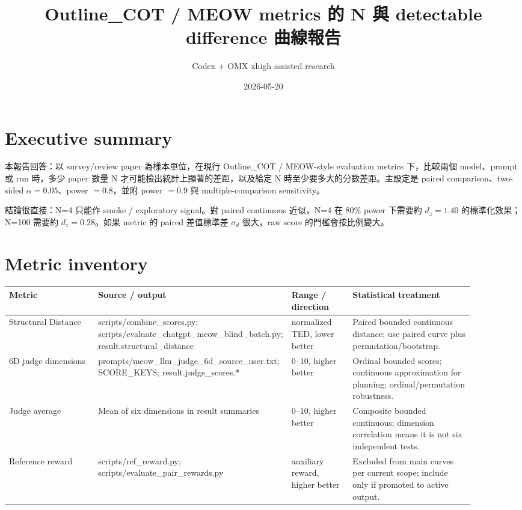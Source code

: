 \documentclass[11pt]{article}
\title{Outline\_COT / MEOW metrics 的 N 與 detectable difference 曲線報告}
\author{Codex + OMX xhigh assisted research}
\date{2026-05-20}
\begin{document}
\maketitle

\section*{Executive summary}
本報告回答：以 survey/review paper 為樣本單位，在現行 Outline\_COT / MEOW-style evaluation metrics 下，比較兩個 model、prompt 或 run 時，多少 paper 數量 N 才可能檢出統計上顯著的差距，以及給定 N 時至少要多大的分數差距。主設定是 paired comparison、two-sided $\alpha=0.05$、power $=0.8$，並附 power $=0.9$ 與 multiple-comparison sensitivity。

結論很直接：N=4 只能作 smoke / exploratory signal。對 paired continuous 近似，N=4 在 80\% power 下需要約 $d_z=1.40$ 的標準化效果；N=100 需要約 $d_z=0.28$。如果 metric 的 paired 差值標準差 $\sigma_d$ 很大，raw score 的門檻會按比例變大。

\section*{Metric inventory}
\begin{longtable}{p{0.22\linewidth}p{0.26\linewidth}p{0.14\linewidth}p{0.28\linewidth}}
\toprule
Metric & Source / output & Range / direction & Statistical treatment \\
\midrule
Structural Distance & scripts/combine\_scores.py; scripts/evaluate\_chatgpt\_meow\_blind\_batch.py; result.structural\_distance & normalized TED, lower better & Paired bounded continuous distance; use paired curve plus permutation/bootstrap. \\
6D judge dimensions & prompts/meow\_llm\_judge\_6d\_source\_user.txt; SCORE\_KEYS; result.judge\_scores.* & 0--10, higher better & Ordinal bounded scores; continuous approximation for planning; ordinal/permutation robustness. \\
Judge average & Mean of six dimensions in result summaries & 0--10, higher better & Composite bounded continuous; dimension correlation means it is not six independent tests. \\
Reference reward & scripts/ref\_reward.py; scripts/evaluate\_pair\_rewards.py & auxiliary reward, higher better & Excluded from main curves per current scope; include only if promoted to active output. \\
\bottomrule
\end{longtable}
\end{document}
